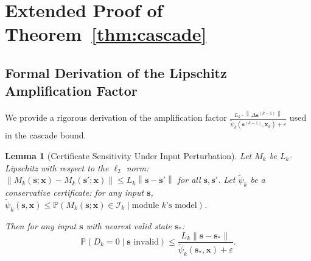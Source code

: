 \documentclass[11pt,twocolumn]{article}
\newtheorem{lemma}[theorem]{Lemma}
\theoremstyle{definition}
\newcommand{\Pbb}{\mathbb{P}}
\newcommand{\norm}[1]{\left\lVert#1\right\rVert}
\begin{document}
\section{Extended Proof of Theorem~\ref{thm:cascade}}

\subsection{Formal Derivation of the Lipschitz Amplification Factor}

We provide a rigorous derivation of the amplification factor
$\frac{L_k \cdot \norm{\Delta\mathbf{s}^{(k-1)}}}
       {\tilde{\psi}_k(\mathbf{s}^{(k-1)}, \mathbf{x}_k) + \varepsilon}$
used in the cascade bound.

\begin{lemma}[Certificate Sensitivity Under Input Perturbation]
\label{lem:cert_sensitivity}
Let $M_k$ be $L_k$-Lipschitz with respect to the $\ell_2$ norm:
$\norm{M_k(\mathbf{s}; \mathbf{x}) - M_k(\mathbf{s}'; \mathbf{x})} \le
L_k \norm{\mathbf{s} - \mathbf{s}'}$ for all $\mathbf{s}, \mathbf{s}'$.
Let $\tilde{\psi}_k$ be a conservative certificate: for any input
$\mathbf{s}$, $\tilde{\psi}_k(\mathbf{s}, \mathbf{x}) \le
\Pbb(M_k(\mathbf{s}; \mathbf{x}) \in \mathcal{I}_k \mid \text{module }k\text{'s model})$.

Then for any input $\mathbf{s}$ with nearest valid state $\mathbf{s}_*$:
\begin{equation}
  \Pbb(D_k = 0 \mid \mathbf{s} \text{ invalid}) \le
  \frac{L_k \norm{\mathbf{s} - \mathbf{s}_*}}
       {\tilde{\psi}_k(\mathbf{s}_*, \mathbf{x}) + \varepsilon}.
\end{equation}
\end{lemma}
\end{document}
